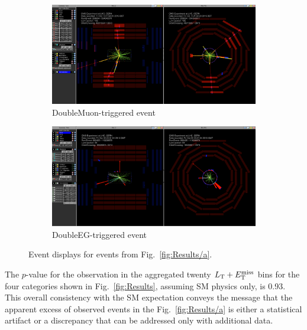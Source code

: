 \begin{figure}
\begin{center}
	\begin{subfigure}{\textwidth}
		\includegraphics[width=\textwidth]{Results/EventDisplay_DoubleMuon}
		\caption{DoubleMuon-triggered event \vspace{1em}}
	\end{subfigure}
	\begin{subfigure}{\textwidth}
		\includegraphics[width=\textwidth]{Results/EventDisplay_DoubleEG}
		\caption{DoubleEG-triggered event}
	\end{subfigure}
	\caption{Event displays for events from Fig.~\ref{fig:Results/a}.
	\label{fig:Results/eventDisplays}}
\end{center}
\end{figure}

The $p$-value for the observation in the aggregated twenty $L_\textrm{T} + E_{\mathrm{T}}^{\text{miss}}$ bins for the four categories shown in Fig.~\ref{fig:Results}, assuming SM physics only, is 0.93. This overall consistency with the SM expectation conveys the message that the apparent excess of observed events in the Fig.~\ref{fig:Results/a} is either a statistical artifact or a discrepancy that can be addressed only with additional data.

